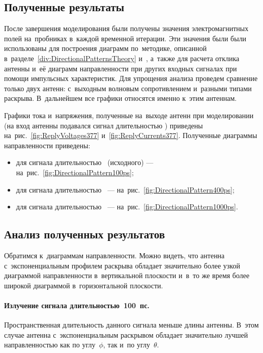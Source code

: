 \subsection{Полученные результаты}

После завершения моделирования были получены значения электромагнитных полей
на~пробниках в~каждой временной итерации. Эти значения были были использованы
для построения диаграмм по~методике, описанной
    в~разделе~\ref{div:DirectionalPatternsTheory}
    и~\cite{bib:MescheryakovUnpublishedReport},
а~также для расчета отклика антенны и~её диаграмм направленности при других
входных сигналах при помощи импульсных характеристик. Для упрощения анализа
проведем сравнение только двух антенн: с~выходным волновым сопротивлением
 и~разными типами раскрыва. В~дальнейшем все графики относятся
именно к~этим антеннам.

Графики тока и~напряжения, полученные на~выходе антенн при моделировании
(на вход антенны подавался сигнал длительностью ) приведены
    на~рис.~\ref{fig:ReplyVoltages377}
    и~\ref{fig:ReplyCurrents377}.
Полученные диаграммы направленности приведены:
\begin{itemize}
\item для сигнала длительностью~ (исходного) ---
      на~рис.~\ref{fig:DirectionalPattern100ps};
\item для сигнала длительностью~ ---
      на~рис.~\ref{fig:DirectionalPattern400ps};
\item для сигнала длительностью~ ---
      на~рис.~\ref{fig:DirectionalPattern1000ps}.
\end{itemize}


\subsection{Анализ полученных результатов}

Обратимся к~диаграммам направленности. Можно видеть, что антенна
с~экспоненциальным профилем раскрыва обладает значительно более узкой диаграммой
направленности в~вертикальной плоскости и~в~то же время более широкой диаграммой
в~горизонтальной плоскости.

\paragraph{Излучение сигнала длительностью~100~пс.\\}
Пространственная длительность данного сигнала меньше длины антенны. В~этом
случае антенна с~экспоненциальным раскрывом обладает значительно лучшей
направленностью как по углу~$\phi$, так и~по углу~$\theta$.

